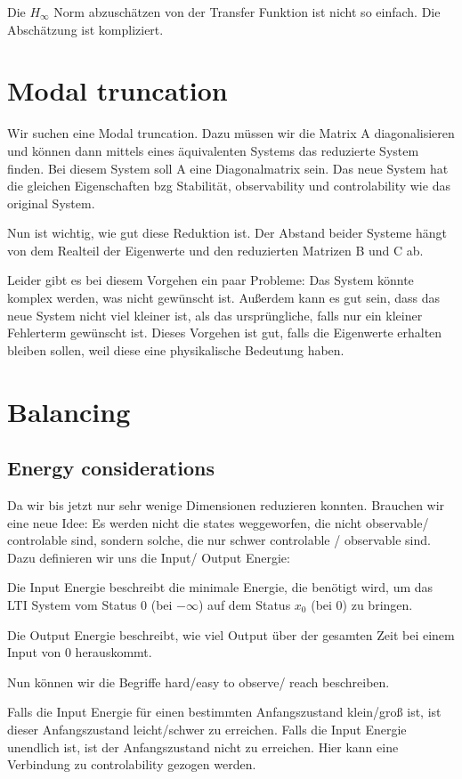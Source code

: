 \documentclass[]{article}
\begin{document}
 Die $H_{\infty}$  Norm abzuschätzen von der Transfer Funktion ist nicht so einfach. Die Abschätzung ist kompliziert.  
  
 \section{Modal truncation}
 Wir suchen eine Modal truncation. Dazu müssen wir die Matrix A diagonalisieren und können dann mittels eines äquivalenten Systems das reduzierte System finden. Bei diesem System soll A eine Diagonalmatrix sein. Das neue System hat die gleichen Eigenschaften bzg Stabilität, observability und controlability wie das original System.  
 
Nun ist wichtig, wie gut diese Reduktion ist. Der Abstand beider Systeme hängt von dem Realteil der Eigenwerte und den reduzierten Matrizen B und C ab. 

Leider gibt es bei diesem Vorgehen ein paar Probleme: Das System könnte komplex werden, was nicht gewünscht ist. Außerdem  kann es gut sein, dass das neue System nicht viel kleiner ist, als das ursprüngliche, falls nur ein kleiner Fehlerterm gewünscht ist. Dieses Vorgehen ist gut, falls die Eigenwerte erhalten bleiben sollen, weil diese eine physikalische Bedeutung haben. 

\section{Balancing}

\subsection{Energy considerations}
Da wir bis jetzt nur sehr wenige Dimensionen reduzieren konnten. Brauchen wir eine neue Idee: Es werden nicht die states weggeworfen, die nicht observable/ controlable sind, sondern solche, die nur schwer controlable / observable sind. Dazu definieren wir uns die Input/ Output Energie: 

Die Input Energie beschreibt die minimale Energie, die benötigt wird, um das LTI System vom Status 0 (bei $- \infty$) auf dem Status $x_0$ (bei 0) zu bringen. 

Die Output Energie beschreibt, wie viel Output über der gesamten Zeit bei einem Input von 0 herauskommt.  
 
Nun können wir die Begriffe hard/easy to observe/ reach beschreiben. 

Falls die Input Energie für einen bestimmten Anfangszustand klein/groß ist, ist dieser Anfangszustand leicht/schwer zu erreichen. Falls die Input Energie unendlich ist, ist der Anfangszustand nicht zu erreichen. Hier kann eine Verbindung zu controlability gezogen werden. 
\end{document}
